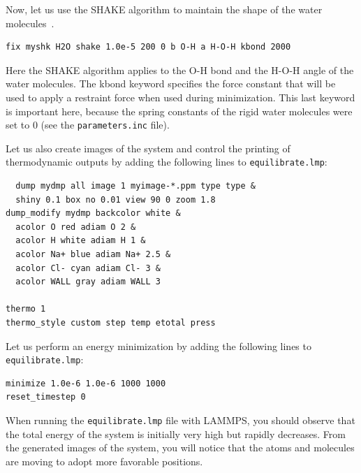 \documentclass[9pt,tutorial]{livecoms}
\newcommand{\lmpcmd}[1]{\hspace{0pt}\colorbox{listing}{\textcolor{command}{\small{#1}}}\hspace{0pt}} %
\newcommand{\flecmd}[1]{\textcolor{command}{\texttt{#1}}} %
\begin{document}
Now, let us use the SHAKE algorithm to maintain the shape of the
water molecules~\cite{ryckaert1977numerical, andersen1983rattle}.
\begin{lstlisting}
fix myshk H2O shake 1.0e-5 200 0 b O-H a H-O-H kbond 2000
\end{lstlisting}
Here the SHAKE algorithm applies to the \lmpcmd{O-H} bond and the \lmpcmd{H-O-H} angle
of the water molecules.  The \lmpcmd{kbond} keyword specifies the force constant that will be
used to apply a restraint force when used during minimization.  This last keyword is important
here, because the spring constants of the rigid water molecules were set
to 0 (see the \flecmd{parameters.inc} file).

Let us also create images of the system and control
the printing of thermodynamic outputs by adding the following lines
to \flecmd{equilibrate.lmp}:
\begin{lstlisting}
  dump mydmp all image 1 myimage-*.ppm type type &
  shiny 0.1 box no 0.01 view 90 0 zoom 1.8
dump_modify mydmp backcolor white &
  acolor O red adiam O 2 &
  acolor H white adiam H 1 &
  acolor Na+ blue adiam Na+ 2.5 &
  acolor Cl- cyan adiam Cl- 3 &
  acolor WALL gray adiam WALL 3

thermo 1
thermo_style custom step temp etotal press
\end{lstlisting}

Let us perform an energy minimization by adding the following lines to \flecmd{equilibrate.lmp}:
\begin{lstlisting}
minimize 1.0e-6 1.0e-6 1000 1000
reset_timestep 0
\end{lstlisting}
When running the \flecmd{equilibrate.lmp} file with LAMMPS, you should observe that the
total energy of the system is initially very high but rapidly decreases.  From the generated
images of the system, you will notice that the atoms and molecules are moving to adopt more favorable positions.
\end{document}
